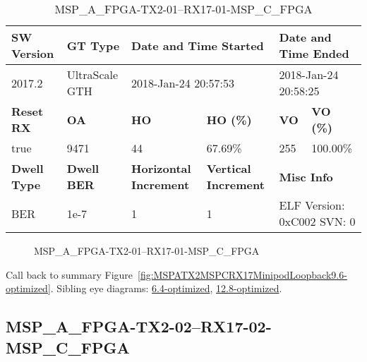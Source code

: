 \begin{table}[h]
\centering
\caption{MSP\_A\_FPGA-TX2-01--RX17-01-MSP\_C\_FPGA}
\label{tab:MSPAFPGATX201RX1701MSPCFPGA9.6-optimized}
\begin{tabular}{@{}|l|l|l|l|l|l|@{}}
\toprule
\textbf{SW Version}                & \textbf{GT Type}   & \multicolumn{2}{l|}{\textbf{Date and Time Started}}            & \multicolumn{2}{l|}{\textbf{Date and Time Ended}}        \\ \midrule
2017.2                       & UltraScale GTH          & \multicolumn{2}{l|}{2018-Jan-24 20:57:53}                   & \multicolumn{2}{l|}{2018-Jan-24 20:58:25}               \\ \midrule
\textbf{Reset RX}                  & \textbf{OA} & \textbf{HO}   & \textbf{HO (\%)} & \textbf{VO} & \textbf{VO (\%)} \\ \midrule
true & 9471        & 44          & 67.69\%        & 255        & 100.00\%       \\ \midrule
\textbf{Dwell Type}                & \textbf{Dwell BER} & \textbf{Horizontal Increment} & \textbf{Vertical Increment}    & \multicolumn{2}{l|}{\textbf{Misc Info}}                  \\ \midrule
BER                            & 1e-7        & 1        & 1           & \multicolumn{2}{l|}{ELF Version: 0xC002 SVN: 0}                         \\ \bottomrule
\end{tabular}
\end{table}

\begin{figure}[h]
\caption{MSP\_A\_FPGA-TX2-01--RX17-01-MSP\_C\_FPGA} \label{fig:MSPAFPGATX201RX1701MSPCFPGA9.6-optimized}
\end{figure}

Call back to summary Figure~\ref{fig:MSPATX2MSPCRX17MinipodLoopback9.6-optimized}.
Sibling eye diagrams: \hyperref[sec:MSPAFPGATX201RX1701MSPCFPGA6.4-optimized]{6.4-optimized}, \hyperref[sec:MSPAFPGATX201RX1701MSPCFPGA12.8-optimized]{12.8-optimized}.

\clearpage
\newpage


\subsection{MSP\_A\_FPGA-TX2-02--RX17-02-MSP\_C\_FPGA}\label{sec:MSPAFPGATX202RX1702MSPCFPGA9.6-optimized}

